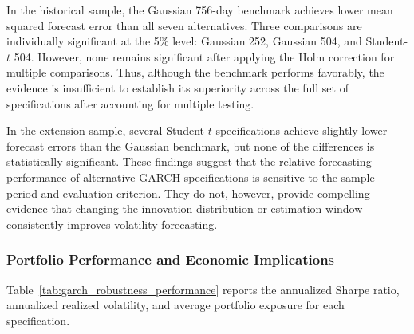 \documentclass[11pt]{article}
\begin{document}
In the historical sample, the Gaussian 756-day
benchmark achieves lower mean squared forecast error
than all seven alternatives. Three comparisons are
individually significant at the 5\% level:
Gaussian 252, Gaussian 504, and Student-$t$ 504.
However, none remains significant after applying
the Holm correction for multiple comparisons.
Thus, although the benchmark performs favorably,
the evidence is insufficient to establish its
superiority across the full set of specifications
after accounting for multiple testing.

In the extension sample, several Student-$t$
specifications achieve slightly lower forecast
errors than the Gaussian benchmark, but none
of the differences is statistically significant.
These findings suggest that the relative
forecasting performance of alternative GARCH
specifications is sensitive to the sample period
and evaluation criterion. They do not, however,
provide compelling evidence that changing the
innovation distribution or estimation window
consistently improves volatility forecasting.


\subsubsection{Portfolio Performance and Economic Implications}

Table~\ref{tab:garch_robustness_performance} reports the
annualized Sharpe ratio, annualized realized volatility, and
average portfolio exposure for each specification.
\end{document}
